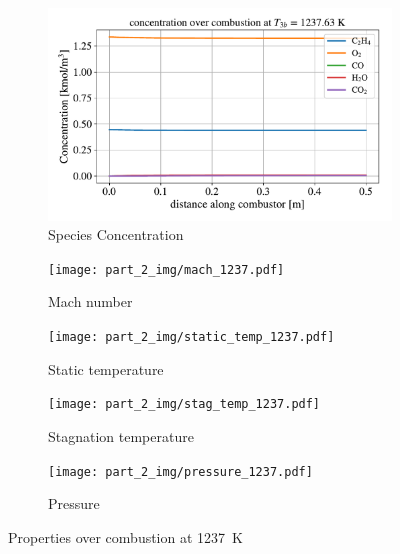 \documentclass[a4paper]{article}
\begin{document}
\begin{figure}[h]
    \centering
    \begin{subfigure}[h]{0.49\linewidth}
        \includegraphics[width=\linewidth]{part_2_img/concentration_1237.63.pdf}
        \caption{Species Concentration}
        \label{subfig:concentration_1237}
    \end{subfigure}
    \begin{subfigure}[h]{0.49\linewidth}
        \texttt{[image: part\_2\_img/mach\_1237.pdf]}
        \caption{Mach number}
        \label{subfig:mach_1237}
    \end{subfigure}
    \begin{subfigure}[h]{0.49\linewidth}
        \texttt{[image: part\_2\_img/static\_temp\_1237.pdf]}
        \caption{Static temperature}
        \label{subfig:temp_1237}
    \end{subfigure}
    \begin{subfigure}[h]{0.49\linewidth}
        \texttt{[image: part\_2\_img/stag\_temp\_1237.pdf]}
        \caption{Stagnation temperature}
        \label{subfig:stag_temp_1237}
    \end{subfigure}
     \begin{subfigure}[h]{0.49\linewidth}
        \texttt{[image: part\_2\_img/pressure\_1237.pdf]}
        \caption{Pressure}
        \label{subfig:pressure_1237}
    \end{subfigure}
    \caption{Properties over combustion at 1237~K}
    \label{fig:properties_1237}
\end{figure}
\end{document}
